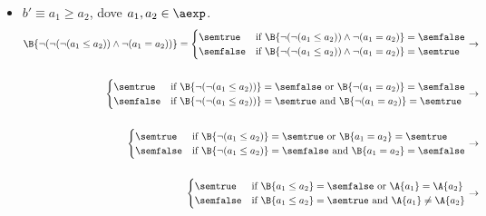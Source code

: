 {\begin{enumerate}[label=(\alph*)]
\begin{itemize}
    \item $ b' \equiv a_1 \geq a_2$, dove $a_1, a_2 \in \aexp$. \\
    \begin{align*}
      \B{\lnot (\lnot (\lnot (a_1 \leq a_2)) \land \lnot (a_1 = a_2) )} =
      \begin{cases}
      \semtrue &
      \mbox{if} \ \B{\lnot (\lnot ( a_1 \leq a_2))
                  \land
                  \lnot (a_1 = a_2)}= \semfalse \\
      \semfalse &
      \mbox{if} \ \B{\lnot (\lnot ( a_1 \leq a_2))
                  \land
                  \lnot (a_1 = a_2)}= \semtrue \\
      \end{cases}
      \rightarrow \\ \\
      \begin{cases}
      \semtrue &
      \mbox{if} \ \B{\lnot (\lnot ( a_1 \leq a_2))} = \semfalse
                  \mbox{ or }
                  \B{\lnot (a_1 = a_2)}= \semfalse \\
      \semfalse &
      \mbox{if} \ \B{\lnot (\lnot ( a_1 \leq a_2))} = \semtrue
                  \mbox{ and }
                  \B{\lnot (a_1 = a_2)}= \semtrue \\
      \end{cases}
      \rightarrow \\ \\
      \begin{cases}
      \semtrue &
      \mbox{if} \ \B{\lnot ( a_1 \leq a_2)} = \semtrue
                  \mbox{ or }
                  \B{a_1 = a_2}= \semtrue \\
      \semfalse &
      \mbox{if} \ \B{\lnot ( a_1 \leq a_2)} = \semfalse
                  \mbox{ and }
                  \B{a_1 = a_2}= \semfalse \\
      \end{cases}
      \rightarrow \\ \\
      \begin{cases}
      \semtrue &
      \mbox{if} \ \B{a_1 \leq a_2} = \semfalse
                  \mbox{ or }
                  \A{a_1} = \A{a_2} \\
      \semfalse &
      \mbox{if} \ \B{a_1 \leq a_2} = \semtrue
                  \mbox{ and }
                  \A{a_1} \neq \A{a_2} \\
      \end{cases}
      \rightarrow \\ \\

\end{align*}
\end{itemize}
\end{enumerate}}
